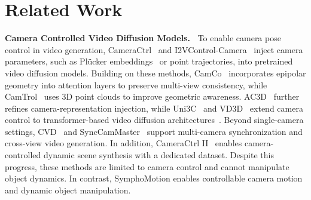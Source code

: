 \section{Related Work}
\label{sec:Related}

\noindent \textbf{Camera Controlled Video Diffusion Models.~}
To enable camera pose control in video generation, CameraCtrl~\cite{he2024cameractrl} and I2VControl-Camera~\cite{feng2024i2vcontrol} inject camera parameters, such as Plücker embeddings~\cite{sitzmann2021light} or point trajectories, into pretrained video diffusion models.
Building on these methods, CamCo~\cite{xu2024camco} incorporates epipolar geometry into attention layers to preserve multi-view consistency, while CamTrol~\cite{hou2024training} uses 3D point clouds to improve geometric awareness.
AC3D~\cite{bahmani2025ac3d} further refines camera-representation injection, while Uni3C~\cite{cao2025uni3c} and VD3D~\cite{bahmani2024vd3d} extend camera control to transformer-based video diffusion architectures~\cite{menapace2024snap}.
Beyond single-camera settings, CVD~\cite{kuang2024collaborative} and SyncCamMaster~\cite{bai2024syncammaster} support multi-camera synchronization and cross-view video generation. In addition, CameraCtrl II~\cite{he2025cameractrl} enables camera-controlled dynamic scene synthesis with a dedicated dataset.
Despite this progress, these methods are limited to camera control and cannot manipulate object dynamics. In contrast, SymphoMotion enables controllable camera motion and dynamic object manipulation.




